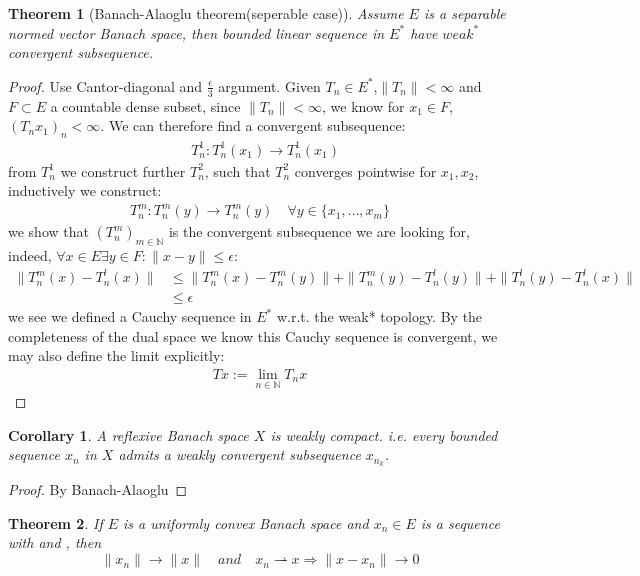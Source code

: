 \documentclass[a4paper,11pt,fleqn]{book}
\newtheorem{theorem}{Theorem}[section]
\newtheorem{corollary}{Corollary}[theorem]
\theoremstyle{definition}
\theoremstyle{remark}
\begin{document}
\begin{theorem}[Banach-Alaoglu theorem(seperable case)]
	Assume $E$ is a separable normed vector Banach space, then bounded linear sequence in $E^*$ have $weak^*$ convergent subsequence.
\end{theorem}
\begin{proof}
	Use Cantor-diagonal and $\frac{\epsilon}{3}$ argument. Given $T_n \in E^*$,$\|T_n\| < \infty$ and $F \subset E$ a countable dense subset, since $\|T_n\| < \infty$, we know for $x_1 \in F$,  $(T_n x_1)_n < \infty $. We can therefore find a convergent subsequence:
	\begin{align*}
		&T_n^1: T_n^1(x_1) \rightarrow T_n^1(x_1)
	\end{align*} 
	from $T_n^1$ we construct further $T_n^2$, such that $T_n^2$ converges pointwise for $x_1, x_2$, inductively we construct:
	\begin{align*}
		T_n^m: T_n^m(y) \rightarrow T_n^m(y) \quad \forall y \in \{x_1, \dots, x_m\}
	\end{align*}
	we show that $(T_n^m)_{m\in \mathbb{N}}$ is the convergent subsequence we are looking for, indeed, $\forall x \in E \exists y \in F: \|x - y\|\le \epsilon$:
	\begin{align*}
		\|T_n^m(x) - T_n^l(x)\| &\le \|T_n^m(x) - T_n^m(y)\| + \|T_n^m(y) - T_n^l(y)\| + \|T_n^l(y) - T_n^l(x)\|\\
		&\le \epsilon
	\end{align*}
	we see we defined a Cauchy sequence in $E^*$ w.r.t. the weak* topology. By the completeness of the dual space we know this Cauchy sequence is convergent, we may also define the limit explicitly:
	\begin{align*}
		Tx := \lim_{n \in \mathbb{N}} T_n x
	\end{align*}
\end{proof}

\begin{corollary}
	A reflexive Banach space $X$ is weakly compact. i.e. every bounded sequence $x_n$ in $X$ admits a weakly convergent subsequence $x_{n_k}$.
\end{corollary}
\begin{proof}
	By Banach-Alaoglu 
\end{proof}

\begin{theorem}
	If $E$ is a uniformly convex Banach space and $x_n \in E$ is a sequence with  and , then 
	\begin{equation*}
		\|x_n\| \rightarrow \|x\| \quad and \quad x_n \rightharpoonup x \Rightarrow \|x - x_n\| \rightarrow 0
	\end{equation*}
\end{theorem}
\end{document}
